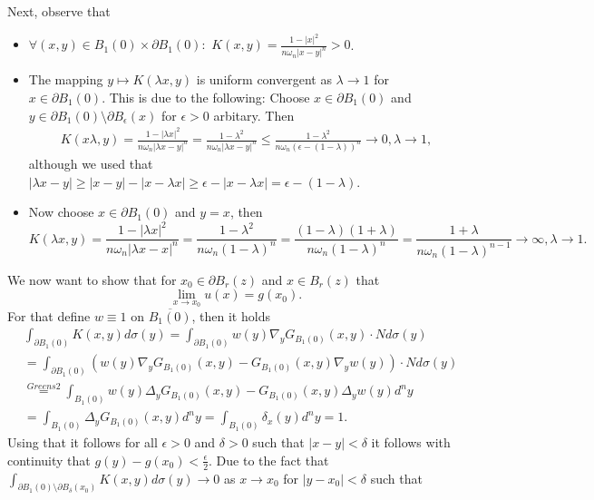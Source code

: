 \documentclass[A4,12pt,twoside]{book}
\begin{document}
{\[    \]
    Next, observe that 
    \begin{itemize}
        \item $\forall (x,y) \in B_1 (0) \times \partial B_1 (0): $ $K(x,y) = \frac{1-|x|^2}{n \omega_n |x-y|^n}>0$. 
        \item The mapping $y \mapsto K(\lambda x,y )$ is uniform convergent as $\lambda \to 1$ for $x \in \partial B_1 (0)$. This is due to the following: Choose $x \in \partial B_1 (0)$ and $y \in \partial B_1 (0) \setminus \partial B_\epsilon (x)$ for $\epsilon >0$ arbitary. Then 
\begin{align*}
    K(x \lambda ,y ) = \frac{1-|\lambda x|^2}{n \omega_n |\lambda x-y|^n} = \frac{1-\lambda^2}{n \omega_n |\lambda x-y|^n} \leq \frac{1-\lambda^2}{n \omega_n ( \epsilon- (1-\lambda) )^n}  \to 0, \lambda \to 1,
\end{align*}
although we used that $|\lambda x - y| \geq |x-y| - |  x-\lambda x |   \geq \epsilon - | x-\lambda x |  =  \epsilon-(1-\lambda) $. 
\item Now choose $x \in \partial B_1 (0)$ and $y=x$, then 
\[
K(\lambda x,y) = \frac{1-|\lambda x|^2}{n \omega_n |\lambda x -x|^n} = \frac{1-\lambda^2}{n \omega_n (1-\lambda)^n} =\frac{(1-\lambda) (1+\lambda)}{n \omega_n (1-\lambda)^n} = \frac{ 1+\lambda}{n \omega_n (1-\lambda)^{n-1}} \to \infty, \lambda \to 1. 
\]
    \end{itemize}
    We now want to show that for $x_0 \in \partial B_r (z)$ and $x \in B_r (z)$ that 
    \[
    \lim_{x \to x_0} u(x) = g(x_0).
    \]
    For that define $w \equiv 1$ on $\overline{B_1 (0)}$, then it holds 
    \begin{align*}
        &\int_{\partial B_1 (0)} K(x,y) d \sigma (y) = \int_{\partial B_1 (0)} w(y) \nabla_y G_{B_1 (0)} (x,y) \cdot N d \sigma (y)\\
        &= \int_{\partial B_1 (0)} ( w(y) \nabla_y G_{B_1 (0)} (x,y) -  G_{B_1 (0)} (x,y) \nabla_y w(y) ) \cdot N d \sigma (y) \\
        &\stackrel{Greens2}{=} \int_{ B_1 (0) }  w(y) \Delta_y G_{B_1 (0)} (x,y) -  G_{B_1 (0)} (x,y) \Delta_y w(y)  d^n y \\
        &= \int_{ B_1 (0) }  \Delta_y G_{B_1 (0)} (x,y) d^n y =\int_{ B_1 (0) }  \delta_x (y) d^n y = 1.
    \end{align*}
    Using that it follows for all $\epsilon >0$ and $\delta >0$ such that $|x-y|< \delta$ it follows with continuity that $g(y)-g(x_0)< \frac{\epsilon}{2}$. Due to the fact that $\int_{\partial B_1 (0) \setminus \partial B_\delta (x_0) } K(x,y) d \sigma (y) \to 0$ as $x \to x_0$ for $|y-x_0|< \delta$ such that 
}
\end{document}
